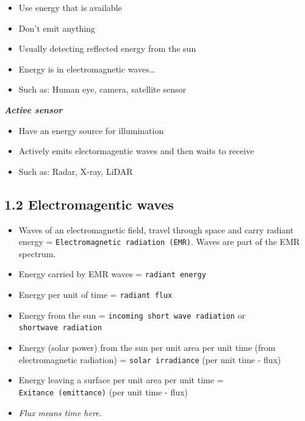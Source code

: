 \documentclass[
  letterpaper,
  DIV=11,
  numbers=noendperiod]{scrreprt}
\providecommand{\tightlist}{%
  \setlength{\itemsep}{0pt}\setlength{\parskip}{0pt}}\usepackage{longtable,booktabs,array}
\begin{document}
\begin{itemize}
\tightlist
\item
  Use energy that is available
\item
  Don't emit anything
\item
  Usually detecting reflected energy from the sun
\item
  Energy is in electromagnetic waves\ldots{}
\item
  Such as: Human eye, camera, satellite sensor
\end{itemize}

\textbf{\emph{Active sensor}}

\begin{itemize}
\tightlist
\item
  Have an energy source for illumination
\item
  Actively emits electormagentic waves and then waits to receive
\item
  Such as: Radar, X-ray, LiDAR
\end{itemize}

\hypertarget{electromagentic-waves}{%
\subsection*{\texorpdfstring{\textbf{1.2 Electromagentic
waves}}{1.2 Electromagentic waves}}\label{electromagentic-waves}}

\begin{tcolorbox}[enhanced jigsaw, toprule=.15mm, opacityback=0, bottomrule=.15mm, arc=.35mm, title=\textcolor{quarto-callout-tip-color}{\faLightbulb}\hspace{0.5em}{Terms}, titlerule=0mm, colframe=quarto-callout-tip-color-frame, coltitle=black, colback=white, left=2mm, bottomtitle=1mm, colbacktitle=quarto-callout-tip-color!10!white, toptitle=1mm, breakable, leftrule=.75mm, rightrule=.15mm, opacitybacktitle=0.6]

\begin{itemize}
\tightlist
\item
  Waves of an electromagnetic field, travel through space and carry
  radiant energy = \texttt{Electromagnetic\ radiation\ (EMR)}. Waves are
  part of the EMR spectrum.
\item
  Energy carried by EMR waves = \texttt{radiant\ energy}
\item
  Energy per unit of time = \texttt{radiant\ flux}
\item
  Energy from the sun = \texttt{incoming\ short\ wave\ radiation} or
  \texttt{shortwave\ radiation}
\item
  Energy (solar power) from the sun per unit area per unit time (from
  electromagnetic radiation) = \texttt{solar\ irradiance} (per unit time
  - flux)
\item
  Energy leaving a surface per unit area per unit time =
  \texttt{Exitance\ (emittance)} (per unit time - flux)
\item
  \emph{Flux means time here.}
\end{itemize}

\end{tcolorbox}
\end{document}
